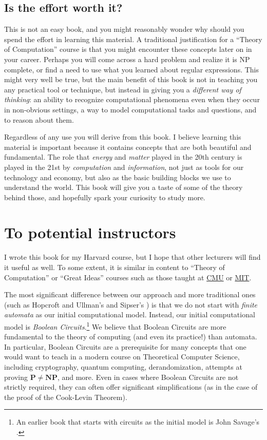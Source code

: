 \subsection{Is the effort worth it?}\label{Is-the-effort-worth-it}

This is not an easy book, and you might reasonably wonder why should you
spend the effort in learning this material. A traditional justification
for a ``Theory of Computation'' course is that you might encounter these
concepts later on in your career. Perhaps you will come across a hard
problem and realize it is NP complete, or find a need to use what you
learned about regular expressions. This might very well be true, but the
main benefit of this book is not in teaching you any practical tool or
technique, but instead in giving you a \emph{different way of thinking}:
an ability to recognize computational phenomena even when they occur in
non-obvious settings, a way to model computational tasks and questions,
and to reason about them.

Regardless of any use you will derive from this book. I believe learning
this material is important because it contains concepts that are both
beautiful and fundamental. The role that \emph{energy} and \emph{matter}
played in the 20th century is played in the 21st by \emph{computation}
and \emph{information}, not just as tools for our technology and
economy, but also as the basic building blocks we use to understand the
world. This book will give you a taste of some of the theory behind
those, and hopefully spark your curiosity to study more.

\section{To potential instructors}\label{To-potential-instructors}

I wrote this book for my Harvard course, but I hope that other lecturers
will find it useful as well. To some extent, it is similar in content to
``Theory of Computation'' or ``Great Ideas'' courses such as those
taught at \href{http://www.cs.cmu.edu/~./15251/}{CMU} or
\href{http://stellar.mit.edu/S/course/6/sp16/6.045/materials.html}{MIT}.

The most significant difference between our approach and more
traditional ones (such as Hopcroft and Ullman's
\cite{HopcroftUllman69, HopcroftUllman79} and Sipser's
\cite{SipserBook}) is that we do not start with \emph{finite automata}
as our initial computational model. Instead, our initial computational
model is \emph{Boolean Circuits}.\footnote{An earlier book that starts
  with circuits as the initial model is John Savage's
  \cite{Savage1998models}.} We believe that Boolean Circuits are more
fundamental to the theory of computing (and even its practice!) than
automata. In particular, Boolean Circuits are a prerequisite for many
concepts that one would want to teach in a modern course on Theoretical
Computer Science, including cryptography, quantum computing,
derandomization, attempts at proving \(\mathbf{P} \neq \mathbf{NP}\),
and more. Even in cases where Boolean Circuits are not strictly
required, they can often offer significant simplifications (as in the
case of the proof of the Cook-Levin Theorem).

